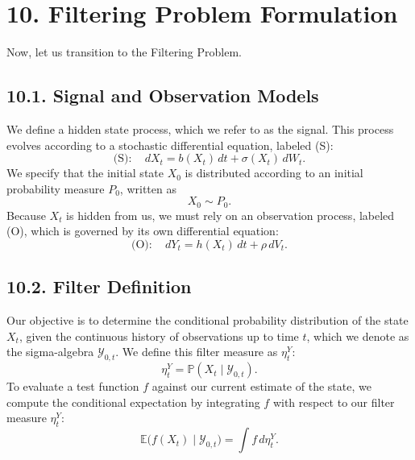 \documentclass[11pt]{article}
\theoremstyle{definition}
\theoremstyle{remark}
\begin{document}
\section*{10. Filtering Problem Formulation}
Now, let us transition to the Filtering Problem.

\subsection*{10.1. Signal and Observation Models}
We define a hidden state process, which we refer to as the signal. This process evolves according to a stochastic differential equation, labeled (S):
\[
\text{(S)}:\quad dX_t=b(X_t)\,dt+\sigma(X_t)\,dW_t.
\]
We specify that the initial state $X_0$ is distributed according to an initial probability measure $P_0$, written as
\[
X_0\sim P_0.
\]
Because $X_t$ is hidden from us, we must rely on an observation process, labeled (O), which is governed by its own differential equation:
\[
\text{(O)}:\quad dY_t=h(X_t)\,dt+\rho\,dV_t.
\]

\subsection*{10.2. Filter Definition}
Our objective is to determine the conditional probability distribution of the state $X_t$, given the continuous history of observations up to time $t$, which we denote as the sigma-algebra $\mathcal Y_{0,t}$. We define this filter measure as $\eta_t^Y$:
\[
\eta_t^Y=\mathbb P(X_t\mid \mathcal Y_{0,t}).
\]
To evaluate a test function $f$ against our current estimate of the state, we compute the conditional expectation by integrating $f$ with respect to our filter measure $\eta_t^Y$:
\[
\mathbb E\!\bigl(f(X_t)\mid \mathcal Y_{0,t}\bigr)=\int f\,d\eta_t^Y.
\]
\end{document}
